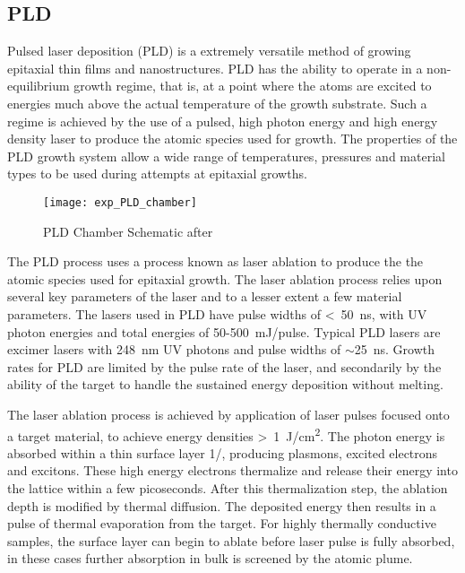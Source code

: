 \subsection{PLD}
Pulsed laser deposition (PLD) is a extremely versatile method of growing epitaxial thin films and nanostructures. PLD has the ability to operate in a non-equilibrium growth regime, that is, at a point where the atoms are excited to energies much above the actual temperature of the growth substrate.  Such a regime is achieved by the use of a pulsed, high photon energy and high energy density laser to produce the atomic species used for growth. The properties of the PLD growth system allow a wide range of temperatures, pressures and material types to be used during attempts at epitaxial growths.
\begin{figure}
    \centering
    \texttt{[image: exp\_PLD\_chamber]}
    \caption{\label{fig:exp_pld_chamber}PLD Chamber Schematic after \cite{stephen-thesis}}
\end{figure}

The PLD process uses a process known as laser ablation to produce the the atomic species used for epitaxial growth. The laser ablation process relies upon several key parameters of the laser and to a lesser extent a few material parameters. The lasers used in PLD have pulse widths of <~50~ns, with UV photon energies and total energies of 50-500~mJ/pulse. Typical PLD lasers are excimer lasers with 248~nm UV photons and pulse widths of $\sim$25~ns. Growth rates for PLD are limited by the pulse rate of the laser, and secondarily by the ability of the target to handle the sustained energy deposition without melting.

The laser ablation process is achieved by application of laser pulses focused onto a target material, to achieve energy densities >~1~J/cm\textsuperscript{2}. The photon energy is absorbed within a thin surface layer 1/\textalpha, producing plasmons, excited electrons and excitons\cite{Willmott2000}. These high energy electrons thermalize and release their energy into the lattice within a few picoseconds. After this thermalization step, the ablation depth is modified by thermal diffusion. The deposited energy then results in a pulse of thermal evaporation from the target. For highly thermally conductive samples, the surface layer can begin to ablate before laser pulse is fully absorbed, in these cases further absorption in bulk is screened by the atomic plume\cite{Willmott2000}.

